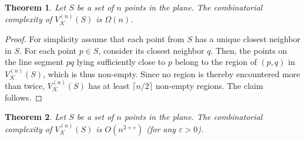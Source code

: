\documentclass[10pt, conference, compsocconf]{IEEEtran}
\newtheorem{theorem}{Theorem}
\def\K{{\mathcal K}}
\newcommand{\eps}{\varepsilon}
\begin{document}
\begin{theorem}
   Let $S$ be a set of $n$ points in the plane.
   The combinatorial complexity of $V_{\K}^{(n)}(S)$ is $\Omega(n)$.
\end{theorem}

\begin{proof}
   For simplicity assume that each point from $S$ has a unique
   closest neighbor in $S$.
   For each point $p \in S$, consider its closest neighbor $q$.
   Then, the points on the line segment $pq$ lying sufficiently close to
   $p$ belong to the region of $(p,q)$ in $V_{\K}^{(n)}(S)$, which is thus
   non-empty.  Since no region is thereby encountered more than twice,
   $V_{\K}^{(n)}(S)$ has at least $\lceil n/2 \rceil$ non-empty regions.
   The claim follows.
\end{proof}

\begin{theorem}
   Let $S$ be a set of $n$ points in the plane.
   The combinatorial complexity of $V_{\K}^{(n)}(S)$ is $O(n^{2+\eps})$
   (for any $\eps > 0$).
\end{theorem}
\end{document}
